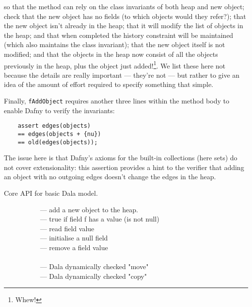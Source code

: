 \noindent so that the method can rely on the class invariants of both heap and new object; check that the new object has no fields (to which objects would they refer?); that the new object isn't already in the heap; that it will modify the list of objects in the heap; and that when completed the history constraint will be maintained (which also maintains the class invariant); that the new object itself is not modified; and that the objects in the heap now consist of all the objects previously in the heap, plus the object just added!\footnote{Whew!}.  We list these here not because the details are really important --- they're not --- but rather to give an idea of the amount of effort required to specify something that simple. 

Finally, \lstinline+fAddObject+ requires another three lines within the method body to enable Dafny to verify the invariants:

\begin{lstlisting}
    assert edges(objects)
    == edges(objects + {nu})
    == old(edges(objects));
\end{lstlisting}

\noindent The issue here is that Dafny's axioms for the built-in collections (here sets) do not cover extensionality:  this assertion provides a hint to the verifier that adding an object with no outgoing edges doesn't change the edges in the heap. 


\begin{table*}[hbtp]
    \caption{Core API for basic Dala model.}
    \label{tab1}
\begin{flushleft}
\ \ \ \ \ \ \ \ \ \  --- add a new object to the heap.\\
\ \ \ \ \ \ \ \ \ \  --- true if field f has a value (is not null)\\
\ \ \ \ \ \ \ \ \ \  --- read field value\\
\ \ \ \ \ \ \ \ \ \  --- initialise a null field\\
\ \ \ \ \ \ \ \ \ \  --- remove a field value\\
~ \\
\ \ \ \ \ \ \ \ \ \  --- Dala dynamically checked "move" \\
\ \ \ \ \ \ \ \ \ \  --- Dala dynamically checked "copy" 
\end{flushleft}
\end{table*}







